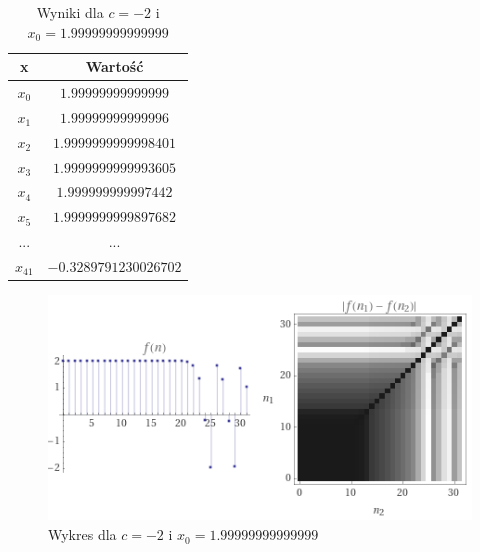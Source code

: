 \documentclass[a4paper,14pt]{report}
\begin{document}
    \begin{table}[H]
    \centering
    \begin{tabular}{|c | c |} 
     \hline
     x & Wartość \\ [0.5ex]
     \hline\hline
     $x_{0}$ & $1.99999999999999$ \\
     $x_{1}$ & $1.99999999999996$ \\
     $x_{2}$ & $1.9999999999998401$ \\
     $x_{3}$ & $1.9999999999993605$ \\
     $x_{4}$ & $1.999999999997442$  \\
     $x_{5}$ & $1.9999999999897682$ \\
     ... & ... \\
     $x_{41}$ & $-0.3289791230026702 $ \\
     \hline
    \end{tabular}
    \caption{Wyniki dla $c=-2$ i $x_{0}=1.99999999999999$}
    \label{Zad6c}
    \end{table}
    \begin{figure}[H]
      \includegraphics[scale=1.0]{wykresZad6c}
      \centering
      \caption{Wykres dla $c=-2$ i $x_{0}=1.99999999999999$}
    \end{figure}
\end{document}

